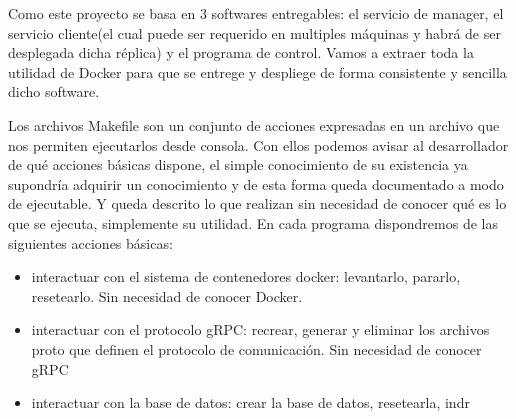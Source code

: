 Como este proyecto se basa en 3 softwares entregables: el servicio de manager, el servicio cliente(el cual puede ser requerido en multiples máquinas y habrá de ser desplegada dicha réplica) y el programa de control. Vamos a extraer toda la utilidad de Docker para que se entrege y despliege de forma consistente y sencilla dicho software.

Los archivos Makefile son un conjunto de acciones expresadas en un archivo que nos permiten ejecutarlos desde consola. Con ellos podemos avisar al desarrollador de qué acciones básicas dispone, el simple conocimiento de su existencia ya supondría adquirir un conocimiento y de esta forma queda documentado a modo de ejecutable. Y queda descrito lo que realizan sin necesidad de conocer qué es lo que se ejecuta, simplemente su utilidad. En cada programa dispondremos de las siguientes acciones básicas:

\begin{itemize}
    \item interactuar con el sistema de contenedores docker: levantarlo, pararlo, resetearlo. Sin necesidad de conocer Docker.
    \item interactuar con el protocolo gRPC: recrear, generar y eliminar los archivos proto que definen el protocolo de comunicación. Sin necesidad de conocer gRPC
    \item interactuar con la base de datos: crear la base de datos, resetearla, indr
\end{itemize}
